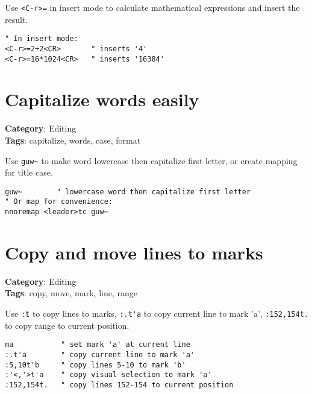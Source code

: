 {{{{Use {\footnotesize \Verb§<C-r>=§} in insert mode to calculate mathematical expressions and insert the result.

\begin{Exa*}{}
\begin{Verbatim}[fontsize=\footnotesize, breaklines, breakanywhere]
" In insert mode:
<C-r>=2+2<CR>       " inserts '4'
<C-r>=16*1024<CR>   " inserts '16384'
\end{Verbatim}
\end{Exa*}

\section{Capitalize words easily}

\textbf{Category}: Editing\\ \textbf{Tags}: capitalize, words, case, format
\vspace{0.5cm}

Use {\footnotesize \Verb§guw~§} to make word lowercase then capitalize first letter, or create mapping for title case.

\begin{Exa*}{}
\begin{Verbatim}[fontsize=\footnotesize, breaklines, breakanywhere]
guw~        " lowercase word then capitalize first letter
" Or map for convenience:
nnoremap <leader>tc guw~
\end{Verbatim}
\end{Exa*}

\section{Copy and move lines to marks}

\textbf{Category}: Editing\\ \textbf{Tags}: copy, move, mark, line, range
\vspace{0.5cm}

Use {\footnotesize \Verb§:t§} to copy lines to marks, {\footnotesize \Verb§:.t'a§} to copy current line to mark 'a', {\footnotesize \Verb§:152,154t.§} to copy range to current position.

\begin{Exa*}{}
\begin{Verbatim}[fontsize=\footnotesize, breaklines, breakanywhere]
ma           " set mark 'a' at current line
:.t'a        " copy current line to mark 'a'
:5,10t'b     " copy lines 5-10 to mark 'b'
:'<,'>t'a    " copy visual selection to mark 'a'
:152,154t.   " copy lines 152-154 to current position
\end{Verbatim}
\end{Exa*}

}}}}
